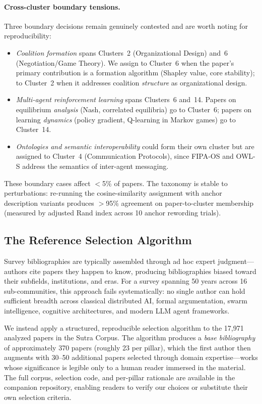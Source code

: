\documentclass{article}
\begin{document}
\paragraph{Cross-cluster boundary tensions.}
Three boundary decisions remain genuinely contested and are worth noting for
reproducibility:
\begin{itemize}[nosep]
\item \emph{Coalition formation} spans Clusters~2 (Organizational Design) and~6
  (Negotiation/Game Theory). We assign to Cluster~6 when the paper's primary
  contribution is a formation algorithm (Shapley value, core stability); to Cluster~2
  when it addresses coalition \emph{structure} as organizational design.
\item \emph{Multi-agent reinforcement learning} spans Clusters~6 and~14. Papers on
  equilibrium \emph{analysis} (Nash, correlated equilibria) go to Cluster~6; papers on
  learning \emph{dynamics} (policy gradient, Q-learning in Markov games) go to
  Cluster~14.
\item \emph{Ontologies and semantic interoperability} could form their own cluster but
  are assigned to Cluster~4 (Communication Protocols), since FIPA-OS and OWL-S address
  the semantics of inter-agent messaging.
\end{itemize}

\noindent
These boundary cases affect $<$5\% of papers. The taxonomy is stable to perturbations:
re-running the cosine-similarity assignment with anchor description variants produces
$>$95\% agreement on paper-to-cluster membership (measured by adjusted Rand index
across 10 anchor rewording trials).

\subsection{The Reference Selection Algorithm}
\label{sec:meth-references}

Survey bibliographies are typically assembled through ad hoc expert judgment---authors
cite papers they happen to know, producing bibliographies biased toward their subfields,
institutions, and eras. For a survey spanning 50 years across 16 sub-communities, this
approach fails systematically: no single author can hold sufficient breadth across
classical distributed AI, formal argumentation, swarm intelligence, cognitive
architectures, and modern LLM agent frameworks.

We instead apply a structured, reproducible selection algorithm to the 17,971 analyzed
papers in the Sutra Corpus. The algorithm produces a \emph{base bibliography} of approximately 370
papers (roughly 23 per pillar), which the first author then augments with 30--50
additional papers selected through domain expertise---works whose significance is
legible only to a human reader immersed in the material. The full corpus, selection
code, and per-pillar rationale are available in the companion repository, enabling
readers to verify our choices or substitute their own selection criteria.
\end{document}
